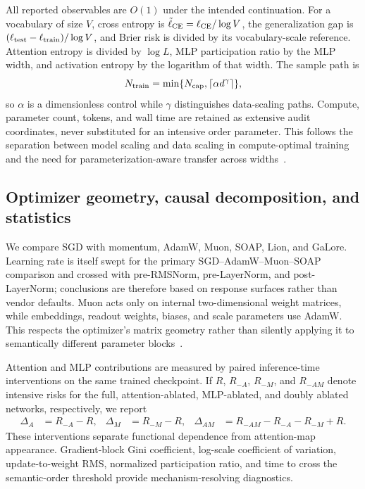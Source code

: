 All reported observables are $O(1)$ under the intended continuation.  For a
vocabulary of size $V$, cross entropy is $\tilde\ell_{\rm CE}=\ell_{\rm
CE}/\log V$, the generalization gap is $(\ell_{\rm test}-\ell_{\rm
train})/\log V$, and Brier risk is divided by its vocabulary-scale reference.
Attention entropy is divided by $\log L$, MLP participation ratio by the MLP
width, and activation entropy by the logarithm of that width.  The sample path
is
\begin{equation}
  N_{\rm train}=\min\{N_{\rm cap},\lceil\alpha d^{\gamma}\rceil\},
\end{equation}
so $\alpha$ is a dimensionless control while $\gamma$ distinguishes data-scaling
paths.  Compute, parameter count, tokens, and wall time are retained as
extensive audit coordinates, never substituted for an intensive order
parameter.  This follows the separation between model scaling and data scaling
in compute-optimal training and the need for parameterization-aware transfer
across widths~\cite{tensor_chinchilla_hoffmann2022,tensor_mup_yang2022}.

\subsection{Optimizer geometry, causal decomposition, and statistics}

We compare SGD with momentum, AdamW, Muon, SOAP, Lion, and GaLore.  Learning rate
is itself swept for the primary SGD--AdamW--Muon--SOAP comparison and crossed
with pre-RMSNorm, pre-LayerNorm, and post-LayerNorm; conclusions are therefore
based on response surfaces rather than vendor defaults.  Muon acts only on
internal two-dimensional weight matrices, while embeddings, readout weights,
biases, and scale parameters use AdamW.  This respects the optimizer's matrix
geometry rather than silently applying it to semantically different parameter
blocks~\cite{tensor_muon_jordan2025,tensor_soap_vyas2024,tensor_galore_zhao2024}.

Attention and MLP contributions are measured by paired inference-time
interventions on the same trained checkpoint.  If $R$, $R_{-A}$, $R_{-M}$, and
$R_{-AM}$ denote intensive risks for the full, attention-ablated, MLP-ablated,
and doubly ablated networks, respectively, we report
\begin{align}
  \Delta_A &= R_{-A}-R, &
  \Delta_M &= R_{-M}-R, &
  \Delta_{AM} &= R_{-AM}-R_{-A}-R_{-M}+R.
\end{align}
These interventions separate functional dependence from attention-map
appearance.  Gradient-block Gini coefficient, log-scale coefficient of
variation, update-to-weight RMS, normalized participation ratio, and time to
cross the semantic-order threshold provide mechanism-resolving diagnostics.

